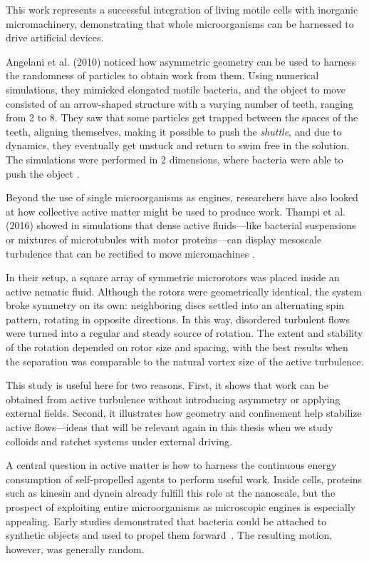 This work represents a successful integration of living motile cells with inorganic micromachinery, demonstrating that whole microorganisms can be harnessed to drive artificial devices. 


Angelani et al. (2010) noticed how asymmetric geometry can be used to harness the randomness of particles to obtain work from them. Using numerical simulations, they mimicked elongated motile bacteria, and the object to move consisted of an arrow-shaped structure with a varying number of teeth, ranging from 2 to 8. They saw that some particles get trapped between the spaces of the teeth, aligning themselves, making it possible to push the \textit{shuttle}, and due to dynamics, they eventually get unstuck and return to swim free in the solution. The simulations were performed in 2 dimensions, where bacteria were able to push the object \cite{angelani2010geometrically}.

Beyond the use of single microorganisms as engines, researchers have also looked at how collective active matter might be used to produce work. Thampi et al. (2016) showed in simulations that dense active fluids—like bacterial suspensions or mixtures of microtubules with motor proteins—can display mesoscale turbulence that can be rectified to move micromachines \cite{thampi2016active}.

In their setup, a square array of symmetric microrotors was placed inside an active nematic fluid. Although the rotors were geometrically identical, the system broke symmetry on its own: neighboring discs settled into an alternating spin pattern, rotating in opposite directions. In this way, disordered turbulent flows were turned into a regular and steady source of rotation. The extent and stability of the rotation depended on rotor size and spacing, with the best results when the separation was comparable to the natural vortex size of the active turbulence.

This study is useful here for two reasons. First, it shows that work can be obtained from active turbulence without introducing asymmetry or applying external fields. Second, it illustrates how geometry and confinement help stabilize active flows—ideas that will be relevant again in this thesis when we study colloids and ratchet systems under external driving.

A central question in active matter is how to harness the continuous energy consumption of self-propelled agents to perform useful work. Inside cells, proteins such as kinesin and dynein already fulfill this role at the nanoscale, but the prospect of exploiting entire microorganisms as microscopic engines is especially appealing. Early studies demonstrated that bacteria could be attached to synthetic objects and used to propel them forward~\cite{weibel2005microoxen, hiratsuka2006microrotary}. The resulting motion, however, was generally random.

